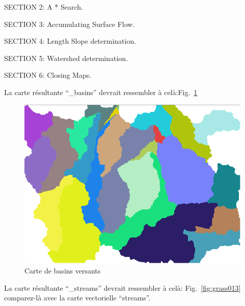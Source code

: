 SECTION 2: A * Search. 

SECTION 3: Accumulating Surface Flow.

SECTION 4: Length Slope determination.

SECTION 5: Watershed determination.

SECTION 6: Closing Maps.

La carte r\'esultante ``\_basins'' devrait ressembler \`a cel\`a:Fig.~\ref{fig:grass012}

\begin{figure}[htbp]
   \centering
   \includegraphics[scale=0.35]{grass012.png}
   \caption{Carte de basins versants}
   \label{fig:grass012}
\end{figure}


La carte r\'esultante ``\_streams'' devrait ressembler \`a cel\`a: Fig.~\ref{fig:grass013} comparez-l\`a avec la carte vectorielle ``streams''.


